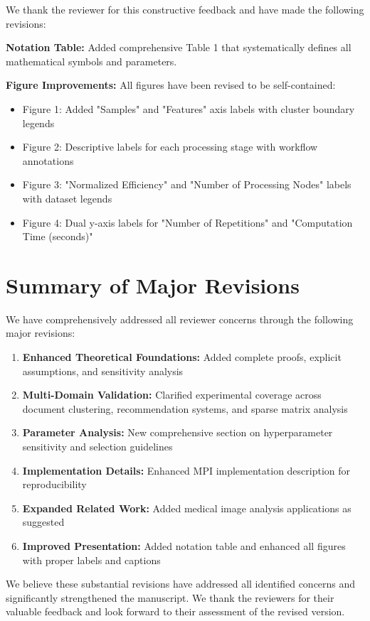 \documentclass{ar2rc}
\begin{document}

\AR We thank the reviewer for this constructive feedback and have made the following revisions:

\textbf{Notation Table:} Added comprehensive Table 1 that systematically defines all mathematical symbols and parameters.

\textbf{Figure Improvements:} All figures have been revised to be self-contained:
\begin{itemize}
  \item Figure 1: Added "Samples" and "Features" axis labels with cluster boundary legends
  \item Figure 2: Descriptive labels for each processing stage with workflow annotations
  \item Figure 3: "Normalized Efficiency" and "Number of Processing Nodes" labels with dataset legends
  \item Figure 4: Dual y-axis labels for "Number of Repetitions" and "Computation Time (seconds)"
\end{itemize}


\section{Summary of Major Revisions}

We have comprehensively addressed all reviewer concerns through the following major revisions:

\begin{enumerate}
  \item \textbf{Enhanced Theoretical Foundations:} Added complete proofs, explicit assumptions, and sensitivity analysis
  \item \textbf{Multi-Domain Validation:} Clarified experimental coverage across document clustering, recommendation systems, and sparse matrix analysis
  \item \textbf{Parameter Analysis:} New comprehensive section on hyperparameter sensitivity and selection guidelines
  \item \textbf{Implementation Details:} Enhanced MPI implementation description for reproducibility
  \item \textbf{Expanded Related Work:} Added medical image analysis applications as suggested
  \item \textbf{Improved Presentation:} Added notation table and enhanced all figures with proper labels and captions
\end{enumerate}

We believe these substantial revisions have addressed all identified concerns and significantly strengthened the manuscript. We thank the reviewers for their valuable feedback and look forward to their assessment of the revised version.

\printbibliography
\end{document}
